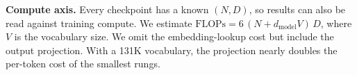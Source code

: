 \textbf{Compute axis.} Every checkpoint has a known $(N, D)$, so results can also be read against training compute. We estimate $\mathrm{FLOPs} = 6\,(N + d_{\mathrm{model}} V)\,D$, where $V$ is the vocabulary size. We omit the embedding-lookup cost but include the output projection. With a 131K vocabulary, the projection nearly doubles the per-token cost of the smallest rungs.
